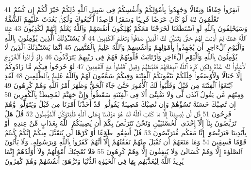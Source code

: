 {\tiny\colorbox{cl_aya}{41}} ٱنفِرُوا۟ خِفَافًا وَثِقَالًا وَجَٰهِدُوا۟ بِأَمْوَٰلِكُمْ وَأَنفُسِكُمْ فِى سَبِيلِ ٱللَّهِ ذَٰلِكُمْ خَيْرٌ لَّكُمْ إِن كُنتُمْ تَعْلَمُونَ
{\tiny\colorbox{cl_aya}{42}} لَوْ كَانَ عَرَضًا قَرِيبًا وَسَفَرًا قَاصِدًا لَّٱتَّبَعُوكَ وَلَٰكِنۢ بَعُدَتْ عَلَيْهِمُ ٱلشُّقَّةُ وَسَيَحْلِفُونَ بِٱللَّهِ لَوِ ٱسْتَطَعْنَا لَخَرَجْنَا مَعَكُمْ يُهْلِكُونَ أَنفُسَهُمْ وَٱللَّهُ يَعْلَمُ إِنَّهُمْ لَكَٰذِبُونَ
{\tiny\colorbox{cl_aya}{43}} عَفَا ٱللَّهُ عَنكَ لِمَ أَذِنتَ لَهُمْ حَتَّىٰ يَتَبَيَّنَ لَكَ ٱلَّذِينَ صَدَقُوا۟ وَتَعْلَمَ ٱلْكَٰذِبِينَ
{\tiny\colorbox{cl_aya}{44}} لَا يَسْتَـْٔذِنُكَ ٱلَّذِينَ يُؤْمِنُونَ بِٱللَّهِ وَٱلْيَوْمِ ٱلْءَاخِرِ أَن يُجَٰهِدُوا۟ بِأَمْوَٰلِهِمْ وَأَنفُسِهِمْ وَٱللَّهُ عَلِيمٌۢ بِٱلْمُتَّقِينَ
{\tiny\colorbox{cl_aya}{45}} إِنَّمَا يَسْتَـْٔذِنُكَ ٱلَّذِينَ لَا يُؤْمِنُونَ بِٱللَّهِ وَٱلْيَوْمِ ٱلْءَاخِرِ وَٱرْتَابَتْ قُلُوبُهُمْ فَهُمْ فِى رَيْبِهِمْ يَتَرَدَّدُونَ
{\tiny\colorbox{cl_aya}{46}} وَلَوْ أَرَادُوا۟ ٱلْخُرُوجَ لَأَعَدُّوا۟ لَهُۥ عُدَّةً وَلَٰكِن كَرِهَ ٱللَّهُ ٱنۢبِعَاثَهُمْ فَثَبَّطَهُمْ وَقِيلَ ٱقْعُدُوا۟ مَعَ ٱلْقَٰعِدِينَ
{\tiny\colorbox{cl_aya}{47}} لَوْ خَرَجُوا۟ فِيكُم مَّا زَادُوكُمْ إِلَّا خَبَالًا وَلَأَوْضَعُوا۟ خِلَٰلَكُمْ يَبْغُونَكُمُ ٱلْفِتْنَةَ وَفِيكُمْ سَمَّٰعُونَ لَهُمْ وَٱللَّهُ عَلِيمٌۢ بِٱلظَّٰلِمِينَ
{\tiny\colorbox{cl_aya}{48}} لَقَدِ ٱبْتَغَوُا۟ ٱلْفِتْنَةَ مِن قَبْلُ وَقَلَّبُوا۟ لَكَ ٱلْأُمُورَ حَتَّىٰ جَآءَ ٱلْحَقُّ وَظَهَرَ أَمْرُ ٱللَّهِ وَهُمْ كَٰرِهُونَ
{\tiny\colorbox{cl_aya}{49}} وَمِنْهُم مَّن يَقُولُ ٱئْذَن لِّى وَلَا تَفْتِنِّىٓ أَلَا فِى ٱلْفِتْنَةِ سَقَطُوا۟ وَإِنَّ جَهَنَّمَ لَمُحِيطَةٌۢ بِٱلْكَٰفِرِينَ
{\tiny\colorbox{cl_aya}{50}} إِن تُصِبْكَ حَسَنَةٌ تَسُؤْهُمْ وَإِن تُصِبْكَ مُصِيبَةٌ يَقُولُوا۟ قَدْ أَخَذْنَآ أَمْرَنَا مِن قَبْلُ وَيَتَوَلَّوا۟ وَّهُمْ فَرِحُونَ
{\tiny\colorbox{cl_aya}{51}} قُل لَّن يُصِيبَنَآ إِلَّا مَا كَتَبَ ٱللَّهُ لَنَا هُوَ مَوْلَىٰنَا وَعَلَى ٱللَّهِ فَلْيَتَوَكَّلِ ٱلْمُؤْمِنُونَ
{\tiny\colorbox{cl_aya}{52}} قُلْ هَلْ تَرَبَّصُونَ بِنَآ إِلَّآ إِحْدَى ٱلْحُسْنَيَيْنِ وَنَحْنُ نَتَرَبَّصُ بِكُمْ أَن يُصِيبَكُمُ ٱللَّهُ بِعَذَابٍ مِّنْ عِندِهِۦٓ أَوْ بِأَيْدِينَا فَتَرَبَّصُوٓا۟ إِنَّا مَعَكُم مُّتَرَبِّصُونَ
{\tiny\colorbox{cl_aya}{53}} قُلْ أَنفِقُوا۟ طَوْعًا أَوْ كَرْهًا لَّن يُتَقَبَّلَ مِنكُمْ إِنَّكُمْ كُنتُمْ قَوْمًا فَٰسِقِينَ
{\tiny\colorbox{cl_aya}{54}} وَمَا مَنَعَهُمْ أَن تُقْبَلَ مِنْهُمْ نَفَقَٰتُهُمْ إِلَّآ أَنَّهُمْ كَفَرُوا۟ بِٱللَّهِ وَبِرَسُولِهِۦ وَلَا يَأْتُونَ ٱلصَّلَوٰةَ إِلَّا وَهُمْ كُسَالَىٰ وَلَا يُنفِقُونَ إِلَّا وَهُمْ كَٰرِهُونَ
{\tiny\colorbox{cl_aya}{55}} فَلَا تُعْجِبْكَ أَمْوَٰلُهُمْ وَلَآ أَوْلَٰدُهُمْ إِنَّمَا يُرِيدُ ٱللَّهُ لِيُعَذِّبَهُم بِهَا فِى ٱلْحَيَوٰةِ ٱلدُّنْيَا وَتَزْهَقَ أَنفُسُهُمْ وَهُمْ كَٰفِرُونَ
